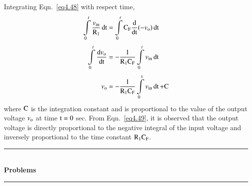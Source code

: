 Integrating Eqn.~\eqref{eq4.48} with respect time,
\begin{align}
\int\limits^{t}_{0}\frac{v_{\text{in}}}{\textrm{R}_{1}}\operatorname{dt} &= \int\limits^{t}_{0}\textrm{C}_{\textrm{F}}\dfrac{\textrm{d}}{\operatorname{dt}}(-v_{\textrm{o}})\operatorname{dt}\notag\\[3pt]
\int\limits^{t}_{0}\dfrac{\textrm{d} v_{\textrm{o}}}{\operatorname{dt}} &= -\dfrac{1}{\textrm{R}_{1}\textrm{C}_{\textrm{F}}}\int\limits^{t}_{0}v_{\text{in}}\operatorname{dt}\notag\\[3pt]
v_{\textrm{o}} &= -\frac{1}{\textrm{R}_{1}\textrm{C}_{\textrm{F}}}\int\limits^{\textrm{t}}_{0}v_{\text{in}}\operatorname{dt}+\textrm{C}\label{eq4.49}
\end{align}
where $\textrm{C}$ is the integration constant and is proportional to the value of the output voltage $v_{\textrm{o}}$ at time $\textrm{t}=0$ sec. From Eqn.~\eqref{eq4.49}, it is observed that the output voltage is directly proportional to the negative integral of the input voltage and inversely proportional to the time constant $\textrm{R}_{1}\textrm{C}_{\textrm{F}}$.

\begin{center}
\rule{4cm}{1pt}\\
{\bf\Large Problems}\\[-3pt]
\rule{4cm}{1pt}
\end{center}

